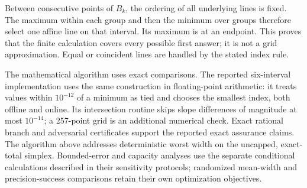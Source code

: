 Between consecutive points of $B_k$, the ordering of all underlying lines
is fixed.  The maximum within each group and then the minimum over groups
therefore select one affine line on that interval.  Its maximum is at an
endpoint.  This proves that the finite calculation covers every possible
first answer; it is not a grid approximation.  Equal or coincident lines
are handled by the stated index rule.

The mathematical algorithm uses exact comparisons.  The reported
six-interval implementation uses the same construction in floating-point
arithmetic: it treats values within $10^{-12}$ of a minimum as tied and
chooses the smallest index, both offline and online.  Its intersection
routine skips slope differences of magnitude at most $10^{-14}$; a
257-point grid is an additional numerical check.  Exact rational branch
and adversarial certificates support the reported exact assurance claims.
The algorithm above addresses deterministic worst width on the uncapped,
exact-total simplex.  Bounded-error and capacity analyses use the separate
conditional calculations described in their sensitivity protocols;
randomized mean-width and precision-success comparisons retain their own
optimization objectives.
